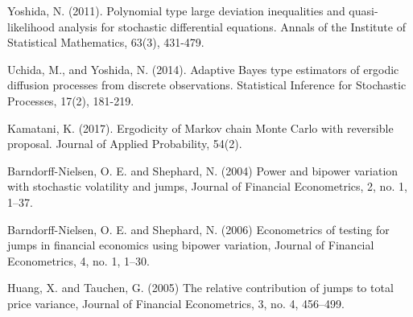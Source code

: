 
\begin{thebibliography}{00}
		
Yoshida, N. (2011). 
\newblock Polynomial type large deviation inequalities and quasi-likelihood analysis for stochastic differential equations. 
\newblock Annals of the Institute of Statistical Mathematics, 63(3), 431-479.

Uchida, M., and Yoshida, N. (2014). 
\newblock Adaptive Bayes type estimators of ergodic diffusion processes from discrete observations. 
\newblock Statistical Inference for Stochastic Processes, 17(2), 181-219.

Kamatani, K. (2017).
\newblock Ergodicity of Markov chain Monte Carlo with reversible proposal. 
\newblock Journal of Applied Probability, 54(2).
	
Barndorff-Nielsen, O. E. and Shephard, N. (2004) 
\newblock Power and bipower variation with stochastic volatility and jumps, 
\newblock Journal of Financial Econometrics, 2, no. 1, 1–37.
	
Barndorff-Nielsen, O. E. and Shephard, N. (2006) 
\newblock Econometrics of testing for jumps in financial economics using bipower variation, 
\newblock Journal of Financial Econometrics, 4, no. 1, 1–30.
	
Huang, X. and Tauchen, G. (2005) 
\newblock The relative contribution of jumps to total price variance, 
\newblock Journal of Financial Econometrics, 3, no. 4, 456–499.
	
\end{thebibliography}

